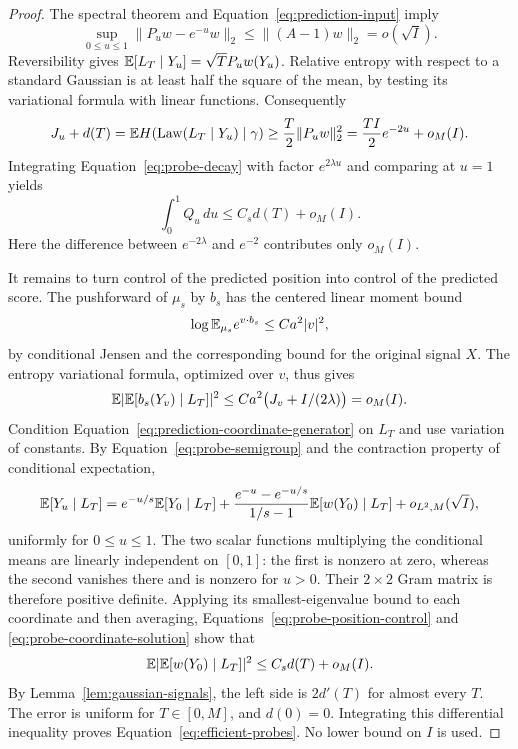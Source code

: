 \begin{proof}
The spectral theorem and Equation~\eqref{eq:prediction-input} imply
\begin{equation}
 \sup_{0\le u\le1}\|P_uw-e^{-u}w\|_2
 \le \|(A-1)w\|_2=o(\sqrt I).
 \label{eq:probe-semigroup}
\end{equation}
Reversibility gives
$\mathbb E[L_T\mid Y_u]=\sqrt T P_uw(Y_u)$.  Relative entropy with respect
to a standard Gaussian is at least half the square of the mean, by
testing its variational formula with linear functions.  Consequently
\[
 J_u+d(T)=\mathbb E H(\operatorname{Law}(L_T\mid Y_u)\mid\gamma)
 \ge\frac T2\|P_uw\|_2^2
 =\frac{TI}{2}e^{-2u}+o_M(I).
\]
Integrating Equation~\eqref{eq:probe-decay} with factor $e^{2\lambda u}$
and comparing at $u=1$ yields
\begin{equation}
 \int_0^1Q_u\,du\le C_s d(T)+o_M(I).
 \label{eq:probe-position-control}
\end{equation}
Here the difference between $e^{-2\lambda}$ and $e^{-2}$ contributes
only $o_M(I)$.

It remains to turn control of the predicted position into control of the
predicted score.  The pushforward of $\mu_s$ by $b_s$ has the centered
linear moment bound
\[
 \log\mathbb E_{\mu_s}e^{v\cdot b_s}\le Ca^2|v|^2,
\]
by conditional Jensen and the corresponding bound for the original
signal $X$.  The entropy variational formula, optimized over $v$, thus
gives
\[
 \mathbb E|\mathbb E[b_s(Y_v)\mid L_T]|^2
 \le Ca^2\bigl(J_v+I/(2\lambda)\bigr)=o_M(I).
\]
Condition Equation~\eqref{eq:prediction-coordinate-generator} on $L_T$
and use variation of constants.  By
Equation~\eqref{eq:probe-semigroup} and the contraction property of
conditional expectation,
\begin{equation}
 \mathbb E[Y_u\mid L_T]
 =e^{-u/s}\mathbb E[Y_0\mid L_T]
 +\frac{e^{-u}-e^{-u/s}}{1/s-1}\mathbb E[w(Y_0)\mid L_T]
 +o_{L^2,M}(\sqrt I),
 \label{eq:probe-coordinate-solution}
\end{equation}
uniformly for $0\le u\le1$.  The two scalar functions multiplying the
conditional means are linearly independent on $[0,1]$: the first is
nonzero at zero, whereas the second vanishes there and is nonzero for
$u>0$.  Their $2\times2$ Gram matrix is therefore positive definite.
Applying its smallest-eigenvalue bound to each coordinate and then
averaging, Equations~\eqref{eq:probe-position-control} and
\eqref{eq:probe-coordinate-solution} show that
\[
 \mathbb E|\mathbb E[w(Y_0)\mid L_T]|^2\le C_s d(T)+o_M(I).
\]
By Lemma~\ref{lem:gaussian-signals}, the left side is $2d'(T)$ for
almost every $T$.  The error is uniform for $T\in[0,M]$, and $d(0)=0$.
Integrating this differential inequality proves
Equation~\eqref{eq:efficient-probes}.  No lower bound on $I$ is used.
\end{proof}

